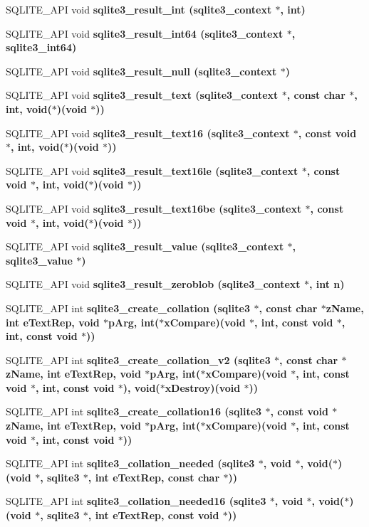 \begin{CompactItemize}
\item 
SQLITE\_\-API void \bf{sqlite3\_\-result\_\-int} (\bf{sqlite3\_\-context} $\ast$, int)
\item 
SQLITE\_\-API void \bf{sqlite3\_\-result\_\-int64} (\bf{sqlite3\_\-context} $\ast$, \bf{sqlite3\_\-int64})
\item 
SQLITE\_\-API void \bf{sqlite3\_\-result\_\-null} (\bf{sqlite3\_\-context} $\ast$)
\item 
SQLITE\_\-API void \bf{sqlite3\_\-result\_\-text} (\bf{sqlite3\_\-context} $\ast$, const char $\ast$, int, void($\ast$)(void $\ast$))
\item 
SQLITE\_\-API void \bf{sqlite3\_\-result\_\-text16} (\bf{sqlite3\_\-context} $\ast$, const void $\ast$, int, void($\ast$)(void $\ast$))
\item 
SQLITE\_\-API void \bf{sqlite3\_\-result\_\-text16le} (\bf{sqlite3\_\-context} $\ast$, const void $\ast$, int, void($\ast$)(void $\ast$))
\item 
SQLITE\_\-API void \bf{sqlite3\_\-result\_\-text16be} (\bf{sqlite3\_\-context} $\ast$, const void $\ast$, int, void($\ast$)(void $\ast$))
\item 
SQLITE\_\-API void \bf{sqlite3\_\-result\_\-value} (\bf{sqlite3\_\-context} $\ast$, \bf{sqlite3\_\-value} $\ast$)
\item 
SQLITE\_\-API void \bf{sqlite3\_\-result\_\-zeroblob} (\bf{sqlite3\_\-context} $\ast$, int n)
\item 
SQLITE\_\-API int \bf{sqlite3\_\-create\_\-collation} (\bf{sqlite3} $\ast$, const char $\ast$z\-Name, int e\-Text\-Rep, void $\ast$p\-Arg, int($\ast$x\-Compare)(void $\ast$, int, const void $\ast$, int, const void $\ast$))
\item 
SQLITE\_\-API int \bf{sqlite3\_\-create\_\-collation\_\-v2} (\bf{sqlite3} $\ast$, const char $\ast$z\-Name, int e\-Text\-Rep, void $\ast$p\-Arg, int($\ast$x\-Compare)(void $\ast$, int, const void $\ast$, int, const void $\ast$), void($\ast$x\-Destroy)(void $\ast$))
\item 
SQLITE\_\-API int \bf{sqlite3\_\-create\_\-collation16} (\bf{sqlite3} $\ast$, const void $\ast$z\-Name, int e\-Text\-Rep, void $\ast$p\-Arg, int($\ast$x\-Compare)(void $\ast$, int, const void $\ast$, int, const void $\ast$))
\item 
SQLITE\_\-API int \bf{sqlite3\_\-collation\_\-needed} (\bf{sqlite3} $\ast$, void $\ast$, void($\ast$)(void $\ast$, \bf{sqlite3} $\ast$, int e\-Text\-Rep, const char $\ast$))
\item 
SQLITE\_\-API int \bf{sqlite3\_\-collation\_\-needed16} (\bf{sqlite3} $\ast$, void $\ast$, void($\ast$)(void $\ast$, \bf{sqlite3} $\ast$, int e\-Text\-Rep, const void $\ast$))

\end{CompactItemize}
